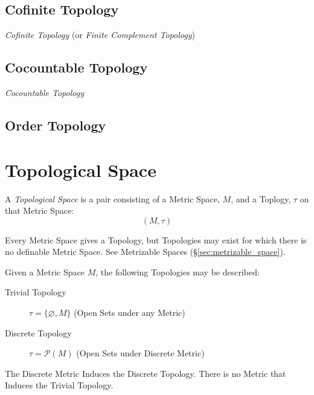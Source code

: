 \subsection{Cofinite Topology}\label{sec:cofinite_topology}

\emph{Cofinite Topology} (or \emph{Finite Complement Topology})



\subsection{Cocountable Topology}\label{sec:cocountable_topology}

\emph{Cocountable Topology}



\subsection{Order Topology}\label{sec:order_topology}



\section{Topological Space}\label{sec:topological_space}

A \emph{Topological Space} is a pair consisting of a Metric Space,
$M$, and a Toplogy, $\tau$ on that Metric Space:
\[
  (M,\tau)
\]

Every Metric Space gives a Topology, but Topologies may exist for
which there is no definable Metric Space. See Metrizable Spaces
(\S\ref{sec:metrizable_space}).

Given a Metric Space $M$, the following Topologies may be described:
\begin{description}
\item[Trivial Topology] $\tau = \{\varnothing, M\}$ (Open Sets under
  any Metric)

\item[Discrete Topology] $\tau = \mathcal{P}(M)$ (Open Sets under
  Discrete Metric)
\end{description}
The Discrete Metric Induces the Discrete Topology. There is no Metric
that Induces the Trivial Topology.

